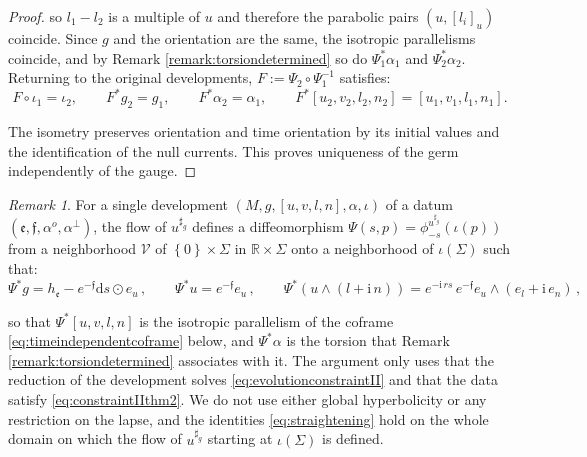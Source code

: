 \documentclass[10pt,reqno,a4paper]{amsart}
\theoremstyle{plain}
\theoremstyle{definition}
\theoremstyle{remark}
\newtheorem{remark}[thm]{Remark}
\theoremstyle{remark}
\def\dd{\mathrm{d}}
\def\fre{\mathfrak{e}}
\renewcommand{\(}{ (}
\renewcommand{\)}{ )}
\newcommand{\frf}{\mathfrak{f}}
\begin{document}
\begin{proof}
\noindent
so $l_1 - l_2$ is a multiple of $u$ and therefore the parabolic pairs $(u,[l_i]_u)$ coincide. Since $g$ and the orientation are the same, the isotropic parallelisms coincide, and by Remark \ref{remark:torsiondetermined} so do $\Psi_1^{\ast}\alpha_1$ and $\Psi_2^{\ast}\alpha_2$. Returning to the original developments, $F:=\Psi_2\circ\Psi_1^{-1}$ satisfies:
\begin{equation*}
F\circ\iota_1=\iota_2,\qquad F^{\ast}g_2=g_1,\qquad F^{\ast}\alpha_2=\alpha_1,\qquad
F^{\ast}[u_2,v_2,l_2,n_2]=[u_1,v_1,l_1,n_1].
\end{equation*}

\noindent
The isometry preserves orientation and time orientation by its initial values and the identification of the null currents. This proves uniqueness of the germ independently of the gauge.
\end{proof}  

\begin{remark}
\label{remark:straightening}
For a single development $(M,g,[u,v,l,n],\alpha,\iota)$ of a datum $(\fre,\frf,\alpha^o,\alpha^{\perp})$, the flow of $u^{\sharp_g}$ defines a diffeomorphism $\Psi(s,p) = \phi^{u^{\sharp_g}}_{-s}(\iota(p))$ from a neighborhood $\mathcal{V}$ of $\left\{ 0\right\}\times\Sigma$ in $\mathbb{R}\times\Sigma$ onto a neighborhood of $\iota(\Sigma)$ such that:
\begin{equation}
\label{eq:straightening}
\Psi^{\ast}g = h_{\fre} - e^{-\frf}\dd s\odot e_u\, , \qquad \Psi^{\ast}u = e^{-\frf}e_u\, , \qquad \Psi^{\ast} ( u\wedge(l + \mathrm{i}\, n) ) = e^{-\mathrm{i}\, r s}\, e^{-\frf}e_u\wedge(e_l + \mathrm{i}\, e_n)\, ,
\end{equation}

\noindent
so that $\Psi^{\ast}[u,v,l,n]$ is the isotropic parallelism of the coframe \eqref{eq:timeindependentcoframe} below, and $\Psi^{\ast}\alpha$ is the torsion that Remark \ref{remark:torsiondetermined} associates with it. The argument only uses that the reduction of the development solves \eqref{eq:evolutionconstraintII} and that the data satisfy \eqref{eq:constraintIIthm2}. We do not use either global hyperbolicity or any restriction on the lapse, and the identities \eqref{eq:straightening} hold on the whole domain on which the flow of $u^{\sharp_g}$ starting at $\iota(\Sigma)$ is defined.
\end{remark}
\end{document}
